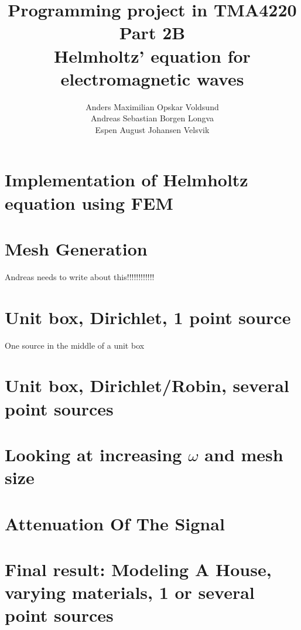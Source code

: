 \documentclass[10pt,a4paper]{article}
\begin{document}
\title{Programming project in TMA4220 \\ Part 2B \\ Helmholtz' equation for electromagnetic waves}
\author{Anders Maximilian Opskar Voldsund \\ Andreas Sebastian Borgen Longva \\ Espen August Johansen Velsvik}
\maketitle











\section*{Implementation of Helmholtz equation using FEM}


\section*{Mesh Generation}
Andreas needs to write about this!!!!!!!!!!!!

\section*{Unit box, Dirichlet, 1 point source}
One source in the middle of a unit box


\section*{Unit box, Dirichlet/Robin, several point sources }


\section*{Looking at increasing $\omega$ and mesh size}



\section*{Attenuation Of The Signal}


\section*{Final result: Modeling A House, varying materials, 1 or several point sources }
\end{document}
